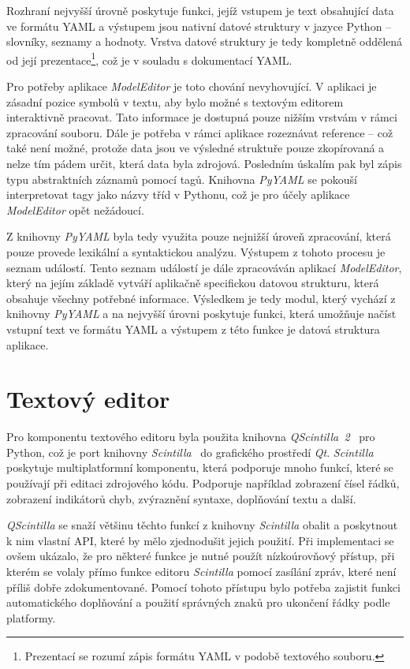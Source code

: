 \documentclass[FM,bw,DP]{tulthesis}
\begin{document}
Rozhraní nejvyšší úrovně poskytuje funkci, jejíž vstupem je text obsahující data ve formátu \gls{YAML} a výstupem jsou nativní datové struktury v jazyce Python -- slovníky, seznamy a hodnoty. Vrstva datové struktury je tedy kompletně oddělená od její prezentace\footnote{Prezentací se rozumí zápis formátu \gls{YAML} v podobě textového souboru.}, což je v souladu s dokumentací \gls{YAML}.

Pro potřeby aplikace \textit{ModelEditor} je toto chování nevyhovující. V aplikaci je zásadní pozice symbolů v textu, aby bylo možné s textovým editorem interaktivně pracovat. Tato informace je dostupná pouze nižším vrstvám v rámci zpracování souboru. Dále je potřeba v rámci aplikace rozeznávat reference -- což také není možné, protože data jsou ve výsledné struktuře pouze zkopírovaná a nelze tím pádem určit, která data byla zdrojová. Posledním úskalím pak byl zápis typu abstraktních záznamů pomocí tagů. Knihovna \textit{PyYAML} se pokouší interpretovat tagy jako názvy tříd v Pythonu, což je pro účely aplikace \textit{ModelEditor} opět nežádoucí.

Z knihovny \textit{PyYAML} byla tedy využita pouze nejnižší úroveň zpracování, která pouze provede lexikální a syntaktickou analýzu. Výstupem z tohoto procesu je seznam událostí. Tento seznam událostí je dále zpracováván aplikací \textit{ModelEditor}, který na jejím základě vytváří aplikačně specifickou datovou strukturu, která obsahuje všechny potřebné informace. Výsledkem je tedy modul, který vychází z knihovny \textit{PyYAML} a na nejvyšší úrovni poskytuje funkci, která umožňuje načíst vstupní text ve formátu \gls{YAML} a výstupem z této funkce je datová struktura aplikace.


\section{Textový editor}

Pro komponentu textového editoru byla použita knihovna \textit{QScintilla~2}~\cite{bib:qscintilla2-python} pro Python, což je port knihovny \textit{Scintilla}~\cite{bib:scintilla} do grafického prostředí \textit{Qt}. \textit{Scintilla} poskytuje multiplatformní komponentu, která podporuje mnoho funkcí, které se používají při editaci zdrojového kódu. Podporuje například zobrazení čísel řádků, zobrazení indikátorů chyb, zvýraznění syntaxe, doplňování textu a další.

\textit{QScintilla} se snaží většinu těchto funkcí z knihovny \textit{Scintilla} obalit a poskytnout k nim vlastní \gls{API}, které by mělo zjednodušit jejich použití. Při implementaci se ovšem ukázalo, že pro některé funkce je nutné použít nízkoúrovňový přístup, při kterém se volaly přímo funkce editoru \textit{Scintilla} pomocí zasílání zpráv, které není příliš dobře zdokumentované. Pomocí tohoto přístupu bylo potřeba zajistit funkci automatického doplňování a použití správných znaků pro ukončení řádky podle platformy.
\end{document}
